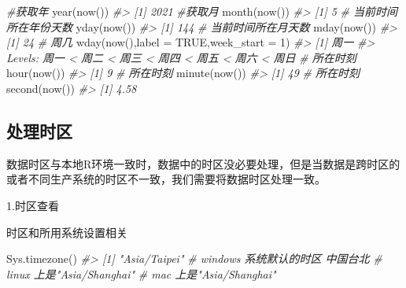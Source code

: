\documentclass[
]{book}
\newenvironment{Shaded}{\begin{snugshade}}{\end{snugshade}}
\newcommand{\AttributeTok}[1]{\textcolor[rgb]{0.77,0.63,0.00}{#1}}
\newcommand{\CommentTok}[1]{\textcolor[rgb]{0.56,0.35,0.01}{\textit{#1}}}
\newcommand{\ConstantTok}[1]{\textcolor[rgb]{0.00,0.00,0.00}{#1}}
\newcommand{\DecValTok}[1]{\textcolor[rgb]{0.00,0.00,0.81}{#1}}
\newcommand{\FunctionTok}[1]{\textcolor[rgb]{0.00,0.00,0.00}{#1}}
\newcommand{\NormalTok}[1]{#1}
\begin{document}
\begin{Shaded}
\begin{Highlighting}[]
\CommentTok{\#获取年}
\FunctionTok{year}\NormalTok{(}\FunctionTok{now}\NormalTok{())  }
\CommentTok{\#\textgreater{} [1] 2021}
\CommentTok{\#获取月}
\FunctionTok{month}\NormalTok{(}\FunctionTok{now}\NormalTok{())}
\CommentTok{\#\textgreater{} [1] 5}
\CommentTok{\# 当前时间所在年份天数}
\FunctionTok{yday}\NormalTok{(}\FunctionTok{now}\NormalTok{())}
\CommentTok{\#\textgreater{} [1] 144}
\CommentTok{\# 当前时间所在月天数}
\FunctionTok{mday}\NormalTok{(}\FunctionTok{now}\NormalTok{())}
\CommentTok{\#\textgreater{} [1] 24}
\CommentTok{\# 周几}
\FunctionTok{wday}\NormalTok{(}\FunctionTok{now}\NormalTok{(),}\AttributeTok{label =} \ConstantTok{TRUE}\NormalTok{,}\AttributeTok{week\_start =} \DecValTok{1}\NormalTok{)}
\CommentTok{\#\textgreater{} [1] 周一}
\CommentTok{\#\textgreater{} Levels: 周一 \textless{} 周二 \textless{} 周三 \textless{} 周四 \textless{} 周五 \textless{} 周六 \textless{} 周日}
\CommentTok{\# 所在时刻}
\FunctionTok{hour}\NormalTok{(}\FunctionTok{now}\NormalTok{())}
\CommentTok{\#\textgreater{} [1] 9}
\CommentTok{\# 所在时刻}
\FunctionTok{minute}\NormalTok{(}\FunctionTok{now}\NormalTok{())}
\CommentTok{\#\textgreater{} [1] 49}
\CommentTok{\# 所在时刻}
\FunctionTok{second}\NormalTok{(}\FunctionTok{now}\NormalTok{())}
\CommentTok{\#\textgreater{} [1] 4.58}
\end{Highlighting}
\end{Shaded}

\hypertarget{time-zones}{%
\subsection{处理时区}\label{time-zones}}

数据时区与本地R环境一致时，数据中的时区没必要处理，但是当数据是跨时区的或者不同生产系统的时区不一致，我们需要将数据时区处理一致。

1.时区查看

时区和所用系统设置相关

\begin{Shaded}
\begin{Highlighting}[]
\FunctionTok{Sys.timezone}\NormalTok{()}
\CommentTok{\#\textgreater{} [1] "Asia/Taipei"}
\CommentTok{\# windows 系统默认的时区 中国台北}
\CommentTok{\# linux 上是"Asia/Shanghai"}
\CommentTok{\# mac 上是"Asia/Shanghai"}
\end{Highlighting}
\end{Shaded}
\end{document}
